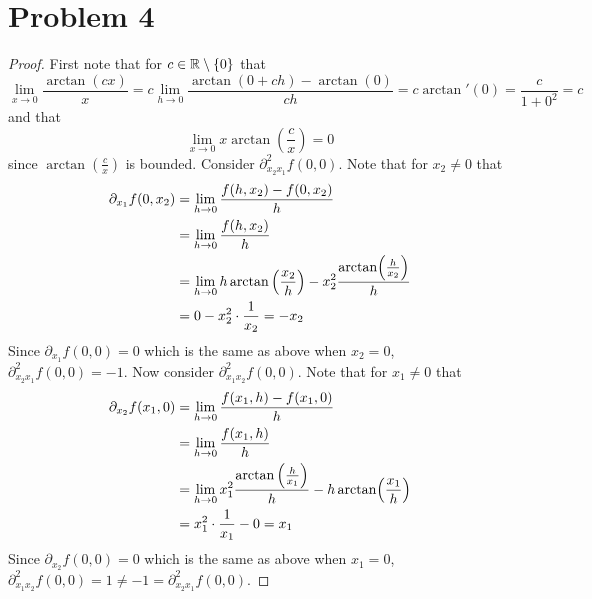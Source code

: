 \documentclass{eeleyes}
\begin{document}
\section*{Problem 4}
\begin{proof}
    First note that for $c \in \mathbb{R} \setminus \qty{0}$ that
    \[
        \lim_{x \to 0} \frac{\arctan(cx)}{x} = c \lim_{h \to 0} \frac{\arctan(0 + ch) - \arctan(0)}{ch} = c \arctan'(0) = \frac{c}{1 + 0^2} = c
    \]
    and that
    \[
        \lim_{x \to 0} x \arctan(\frac{c}{x}) = 0
    \]
    since $\arctan(\frac{c}{x})$ is bounded. Consider $\partial^2_{x_2 x_1} f(0,0)$. Note that for $x_2 \neq 0$ that
    \begin{align*}
        \partial_{x_1} f(0, x_2) &= \lim_{h \to 0} \frac{f(h, x_2) - f(0, x_2)}{h} \\
        &= \lim_{h \to 0} \frac{f(h,x_2)}{h}  \\
        &= \lim_{h \to 0} h \arctan\qty(\frac{x_2}{h}) - x_2^2 \frac{\arctan(\frac{h}{x_2})}{h} \\
        &= 0 - x_2^2 \cdot \frac{1}{x_2} = -x_2
    \end{align*}
    Since $\partial_{x_1} f(0,0) = 0$ which is the same as above when $x_2 = 0$, $\partial^2_{x_2 x_1} f(0,0) = -1$. Now consider $\partial^2_{x_1 x_2} f(0,0)$. Note that for $x_1 \neq 0$ that
    \begin{align*}
        \partial_{x_2} f(x_1, 0) &= \lim_{h \to 0} \frac{f(x_1, h) - f(x_1, 0)}{h} \\
        &= \lim_{h \to 0} \frac{f(x_1, h)}{h} \\
        &= \lim_{h \to 0} x_1^2 \frac{\arctan\qty(\frac{h}{x_1})}{h} - h \arctan(\frac{x_1}{h}) \\
        &= x_1^2 \cdot \frac{1}{x_1} - 0 = x_1
    \end{align*}
    Since $\partial_{x_2} f(0,0) = 0$ which is the same as above when $x_1 = 0$, $\partial^2_{x_1 x_2} f(0,0) = 1 \neq -1 = \partial^2_{x_2 x_1} f(0,0)$.
\end{proof}
\end{document}
